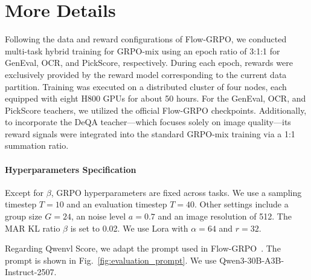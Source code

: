 \clearpage
\appendix
\section{More Details}
\label{Training}
Following the data and reward configurations of Flow-GRPO, we conducted multi-task hybrid training for GRPO-mix using an epoch ratio of 3:1:1 for GenEval, OCR, and PickScore, respectively. During each epoch, rewards were exclusively provided by the reward model corresponding to the current data partition. Training was executed on a distributed cluster of four nodes, each equipped with eight H800 GPUs for about 50 hours. For the GenEval, OCR, and PickScore teachers, we utilized the official Flow-GRPO checkpoints. Additionally, to incorporate the DeQA teacher—which focuses solely on image quality—its reward signals were integrated into the standard GRPO-mix training via a 1:1 summation ratio.

\paragraph{Hyperparameters Specification}\label{app:subsubsec:synthetic-hyperp}
Except for $\beta$, GRPO hyperparameters are fixed across tasks. We use a sampling timestep $T=10$ and an evaluation timestep $T=40$. Other settings include a group size $G=24$, an noise level $a=0.7$ and an image resolution of 512. The MAR KL ratio $\beta$ is set to 0.02. We use Lora with $\alpha=64$ and $r=32$.

\begin{table}[h]
\centering
{}
\end{table}
Regarding Qwenvl Score, we adapt the prompt used in Flow-GRPO~\cite{liu2025flow}. The prompt is shown in Fig.~\ref{fig:evaluation_prompt}. We use 
Qwen3-30B-A3B-Instruct-2507.

